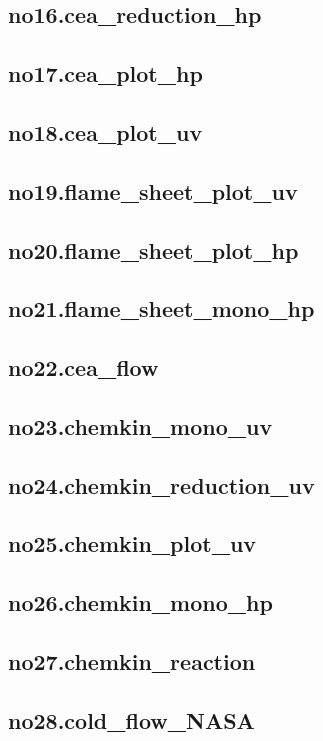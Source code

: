 \documentclass{jsarticle}
\begin{document}
\subsection{no16.cea\_reduction\_hp}
\subsection{no17.cea\_plot\_hp}
\subsection{no18.cea\_plot\_uv}
\subsection{no19.flame\_sheet\_plot\_uv}
\subsection{no20.flame\_sheet\_plot\_hp}
\subsection{no21.flame\_sheet\_mono\_hp}
\subsection{no22.cea\_flow}
\subsection{no23.chemkin\_mono\_uv}
\subsection{no24.chemkin\_reduction\_uv}
\subsection{no25.chemkin\_plot\_uv}
\subsection{no26.chemkin\_mono\_hp}
\subsection{no27.chemkin\_reaction}
\subsection{no28.cold\_flow\_NASA}
\end{document}
